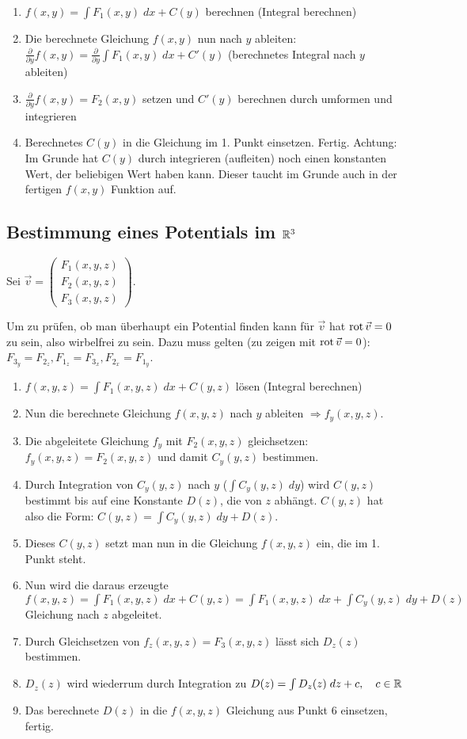 \begin{enumerate}[itemsep=1em]
	\item $f(x,y) = \int F_1(x,y)\;dx + C(y)$ berechnen (Integral berechnen)
	\item Die berechnete Gleichung $f(x,y)$ nun nach $y$ ableiten:
	$\frac{\partial}{\partial y} f(x,y) = \frac{\partial}{\partial y}\int F_1(x,y)\;dx + C'(y)$
	(berechnetes Integral nach $y$ ableiten)
	\item $\frac{\partial}{\partial y} f(x,y) = F_2(x,y)$ setzen und $C'(y)$ berechnen durch umformen
	und integrieren
	\item Berechnetes $C(y)$ in die Gleichung im 1. Punkt einsetzen. Fertig. Achtung: Im Grunde hat
	$C(y)$ durch integrieren (aufleiten) noch einen konstanten Wert, der beliebigen Wert haben kann.
	Dieser taucht im Grunde auch in der fertigen $f(x,y)$ Funktion auf.
\end{enumerate}

\subsection{Bestimmung eines Potentials im $\mathbb{R}^3$}
Sei $\vec{v} = \begin{pmatrix}
F_1(x,y,z)\\
F_2(x,y,z)\\
F_3(x,y,z)
\end{pmatrix}$.

Um zu prüfen, ob man überhaupt ein Potential finden kann für $\vec{v}$ hat $\operatorname{rot} \vec{v} = 0$
zu sein, also wirbelfrei zu sein. Dazu muss gelten (zu zeigen mit $\operatorname{rot} \vec{v} = 0$): 
$F_{3_y} = F_{2_z}, F_{1_z} = F_{3_x}, F_{2_x} = F_{1_y}$.

\begin{enumerate}[itemsep=1em]
	\item $f(x,y,z) = \int F_1(x,y,z)\;dx + C(y,z)$ lösen (Integral berechnen)
	\item Nun die berechnete Gleichung $f(x,y,z)$ nach $y$ ableiten $\Rightarrow f_y(x,y,z)$.
	\item Die abgeleitete Gleichung $f_y$ mit $F_2(x,y,z)$ gleichsetzen: $f_y(x,y,z) = F_2(x,y,z)$
	und damit $C_y(y,z)$ bestimmen.
	\item Durch Integration von $C_y(y,z)$ nach $y$ ($\int C_y(y,z)\;dy$) wird $C(y,z)$ bestimmt
	bis auf eine Konstante $D(z)$, die von $z$ abhängt. $C(y,z)$ hat also die Form:
	$C(y,z) = \int C_y(y,z)\; dy + D(z)$.
	\item Dieses $C(y,z)$ setzt man nun in die Gleichung $f(x,y,z)$ ein, die im 1. Punkt steht.
	\item Nun wird die daraus erzeugte
	$f(x,y,z) = \int F_1(x,y,z)\;dx + C(y,z) = \int F_1(x,y,z)\;dx + \int C_y(y,z)\; dy + D(z)$
	Gleichung nach $z$ abgeleitet.
	\item Durch Gleichsetzen von $f_z(x,y,z) = F_3(x,y,z)$ lässt sich $D_z(z)$ bestimmen.
	\item $D_z(z)$ wird wiederrum durch Integration zu $D(z) = \int D_z(z)\; dz + c, \quad c \in \mathbb{R}$
	\item Das berechnete $D(z)$ in die $f(x,y,z)$ Gleichung aus Punkt 6 einsetzen, fertig.
\end{enumerate}

